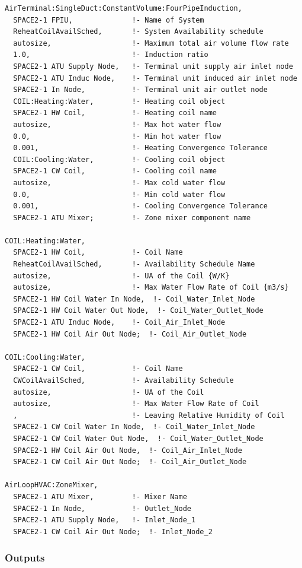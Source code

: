 \begin{lstlisting}
AirTerminal:SingleDuct:ConstantVolume:FourPipeInduction,
  SPACE2-1 FPIU,              !- Name of System
  ReheatCoilAvailSched,       !- System Availability schedule
  autosize,                   !- Maximum total air volume flow rate
  1.0,                        !- Induction ratio
  SPACE2-1 ATU Supply Node,   !- Terminal unit supply air inlet node
  SPACE2-1 ATU Induc Node,    !- Terminal unit induced air inlet node
  SPACE2-1 In Node,           !- Terminal unit air outlet node
  COIL:Heating:Water,         !- Heating coil object
  SPACE2-1 HW Coil,           !- Heating coil name
  autosize,                   !- Max hot water flow
  0.0,                        !- Min hot water flow
  0.001,                      !- Heating Convergence Tolerance
  COIL:Cooling:Water,         !- Cooling coil object
  SPACE2-1 CW Coil,           !- Cooling coil name
  autosize,                   !- Max cold water flow
  0.0,                        !- Min cold water flow
  0.001,                      !- Cooling Convergence Tolerance
  SPACE2-1 ATU Mixer;         !- Zone mixer component name

COIL:Heating:Water,
  SPACE2-1 HW Coil,           !- Coil Name
  ReheatCoilAvailSched,       !- Availability Schedule Name
  autosize,                   !- UA of the Coil {W/K}
  autosize,                   !- Max Water Flow Rate of Coil {m3/s}
  SPACE2-1 HW Coil Water In Node,  !- Coil_Water_Inlet_Node
  SPACE2-1 HW Coil Water Out Node,  !- Coil_Water_Outlet_Node
  SPACE2-1 ATU Induc Node,    !- Coil_Air_Inlet_Node
  SPACE2-1 HW Coil Air Out Node;  !- Coil_Air_Outlet_Node

COIL:Cooling:Water,
  SPACE2-1 CW Coil,           !- Coil Name
  CWCoilAvailSched,           !- Availability Schedule
  autosize,                   !- UA of the Coil
  autosize,                   !- Max Water Flow Rate of Coil
  ,                           !- Leaving Relative Humidity of Coil
  SPACE2-1 CW Coil Water In Node,  !- Coil_Water_Inlet_Node
  SPACE2-1 CW Coil Water Out Node,  !- Coil_Water_Outlet_Node
  SPACE2-1 HW Coil Air Out Node,  !- Coil_Air_Inlet_Node
  SPACE2-1 CW Coil Air Out Node;  !- Coil_Air_Outlet_Node

AirLoopHVAC:ZoneMixer,
  SPACE2-1 ATU Mixer,         !- Mixer Name
  SPACE2-1 In Node,           !- Outlet_Node
  SPACE2-1 ATU Supply Node,   !- Inlet_Node_1
  SPACE2-1 CW Coil Air Out Node;  !- Inlet_Node_2
\end{lstlisting}

\subsubsection{Outputs}\label{outputs-9}

